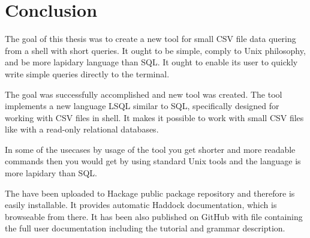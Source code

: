\chapter*{Conclusion}

The goal of this thesis was to create a new tool for small CSV file data quering from a shell with short queries.
It ought to be simple, comply to Unix philosophy, and be more lapidary language than SQL.
It ought to enable its user to quickly write simple queries directly to the terminal.

The goal was successfully accomplished and new tool  was created. The tool implements a new language LSQL similar to
SQL, specifically designed for working with CSV files in shell. It makes it possible to work with small CSV files like with a read-only relational databases.

In some of the usecases by usage of the tool you get shorter and more readable commands then you would get by using standard Unix tools and the 
language is more lapidary than SQL.

The  have been uploaded to Hackage public package repository and therefore is easily installable. 
It provides automatic Haddock documentation, which is browseable from there. 
It has been also published on GitHub with  file containing the full user documentation including the tutorial and grammar description.

